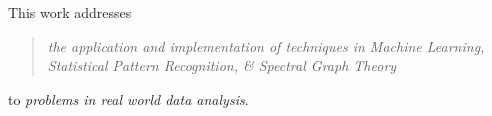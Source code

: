 
This work addresses
\begin{quote}
{\em the application and implementation of techniques in Machine Learning, Statistical Pattern
Recognition, \& Spectral Graph Theory }
\end{quote}
to {\em problems in real world data analysis}.

\medskip
